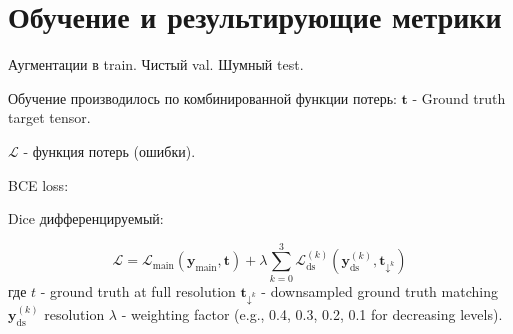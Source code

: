 \section{Обучение и результирующие метрики}

Аугментации в train.
Чистый val.
Шумный test.

Обучение производилось по комбинированной функции потерь:
${\mathbf{t}}$ - Ground truth target tensor.

${\mathcal{L}}$ - функция потерь (ошибки).

BCE loss:


Dice дифференцируемый:


\begin{equation*}
    \mathcal{L} = \mathcal{L}_{\text{main}}(\mathbf{y}_{\text{main}}, \mathbf{t}) + \lambda \sum_{k=0}^{3} \mathcal{L}_{\text{ds}}^{(k)}(\mathbf{y}_{\text{ds}}^{(k)}, \mathbf{t}_{\downarrow^k})
\end{equation*}
где ${t}$ - ground truth at full resolution
${\mathbf{t}_{\downarrow^k}}$ - downsampled ground truth matching ${\mathbf{y}_{\text{ds}}^{(k)}}$ resolution
${\lambda}$ - weighting factor (e.g., 0.4, 0.3, 0.2, 0.1 for decreasing levels).